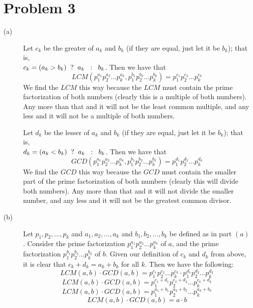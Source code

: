 \documentclass{article}
\begin{document}
\section*{Problem 3}
\begin{description}
    \item[(a)]
        Let $c_k$ be the greater of $a_k$ and $b_k$ (if they are equal,
        just let it be $b_k$); that is, \\
        $c_k = (a_k > b_k) \hspace{2mm} ? \hspace{2mm} a_k \hspace{2mm} :
        \hspace{2mm} b_k$. Then we have that
        \[ LCM(p_1^{a_1}p_2^{a_2}...p_k^{a_k}, p_1^{b_1}p_2^{b_2}...
        p_k^{b_k}) = p_1^{c_1}p_2^{c_2}...p_k^{c_k} \]
        We find the $LCM$ this way because the $LCM$ must contain the prime
        factorization of both numbers (clearly this is a multiple of both
        numbers). Any more than that and it will not be
        the least common multiple, and any less and it will not be a multiple of
        both numbers.

        Let $d_k$ be the lesser of $a_k$ and $b_k$ (if they are equal,
        just let it be $b_k$); that is, \\
        $d_k = (a_k < b_k) \hspace{2mm} ? \hspace{2mm} a_k \hspace{2mm} :
        \hspace{2mm} b_k$. Then we have that
        \[ GCD(p_1^{a_1}p_2^{a_2}...p_k^{a_k}, p_1^{b_1}p_2^{b_2}...
        p_k^{b_k}) = p_1^{d_1}p_2^{d_2}...p_k^{d_k} \]
        We find the $GCD$ this way because the $GCD$ must contain the
        smaller part of the prime factorization of both numbers (clearly
        this will divide both numbers). Any more than that and it will
        not divide the smaller number, and any less and it will not be the
        greatest common divisor.
    \item[(b)]
        Let $p_1,p_2,...,p_k$ and $a_1,a_2,...,a_k$ and $b_1,b_2,...,b_k$ be defined
        as in part $(a)$.
        Consider the prime factorization $p_1^{a_1}p_2^{a_2}...p_k^{a_k}$
        of $a$, and the prime factorization $p_1^{b_1}p_2^{b_2}...
        p_k^{b_k}$ of $b$.
        Given our definition of $c_k$ and $d_k$ from above, it is clear that
        $c_k + d_k = a_k + b_k$ for all $k$. Then we have the following:
        \[ LCM(a,b) \cdot GCD(a,b) = p_1^{c_1}p_2^{c_2}...p_k^{c_k} \cdot
        p_1^{d_1}p_2^{d_2}...p_k^{d_k} \]
        \[ LCM(a,b) \cdot GCD(a,b) = p_1^{c_1 + d_1}p_2^{c_2 + d_2}...p_k^{c_k +
        d_k} \]
        \[ LCM(a,b) \cdot GCD(a,b) = p_1^{a_1 + b_1}p_2^{a_2 + b_2}...p_k^{a_k +
        b_k} \]
        \[ LCM(a,b) \cdot GCD(a,b) = a \cdot b \]
\end{description}
\end{document}
